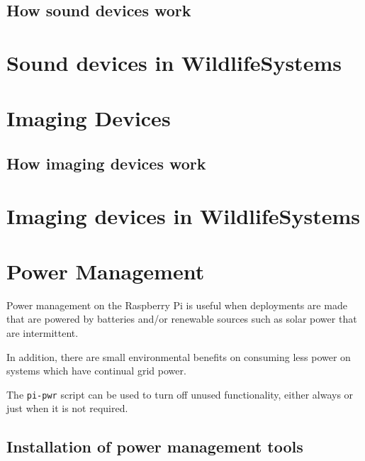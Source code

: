 \documentclass[
]{book}
\begin{document}
\hypertarget{how-sound-devices-work}{%
\section{How sound devices work}\label{how-sound-devices-work}}

\hypertarget{sound-devices-in-wildlifesystems}{%
\chapter{Sound devices in WildlifeSystems}\label{sound-devices-in-wildlifesystems}}

\hypertarget{imaging-devices}{%
\chapter{Imaging Devices}\label{imaging-devices}}

\hypertarget{how-imaging-devices-work}{%
\section{How imaging devices work}\label{how-imaging-devices-work}}

\hypertarget{imaging-devices-in-wildlifesystems}{%
\chapter{Imaging devices in WildlifeSystems}\label{imaging-devices-in-wildlifesystems}}

\hypertarget{power-management}{%
\chapter{Power Management}\label{power-management}}

Power management on the Raspberry Pi is useful when deployments are made that are powered by batteries and/or renewable sources such as solar power that are intermittent.

In addition, there are small environmental benefits on consuming less power on systems which have continual grid power.

The \texttt{pi-pwr} script can be used to turn off unused functionality, either always or just when it is not required.

\hypertarget{installation-of-power-management-tools}{%
\section{Installation of power management tools}\label{installation-of-power-management-tools}}
\end{document}
